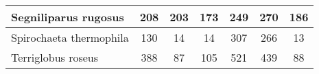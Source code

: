 \begin{minipage}{0.91\textwidth}
\begin{adjustbox}{center}
\begin{tabular}{|l||c|c|c|c|c|c|}
\hline
Segniliparus rugosus & \cellcolor[RGB]{254, 250, 250} 208 & \cellcolor[RGB]{250, 250, 254} 203 & \cellcolor[RGB]{200, 200, 249} 173 & \cellcolor[RGB]{235, 71, 71} 249 & \cellcolor[RGB]{235, 71, 71} 270 & \cellcolor[RGB]{223, 223, 251} 186 \\
\hline
Spirochaeta thermophila & \cellcolor[RGB]{252, 232, 232} 130 & \cellcolor[RGB]{232, 232, 252} 14 & \cellcolor[RGB]{232, 232, 252} 14 & \cellcolor[RGB]{235, 71, 71} 307 & \cellcolor[RGB]{246, 177, 177} 266 & \cellcolor[RGB]{232, 232, 252} 13 \\
\hline
Terriglobus roseus & \cellcolor[RGB]{252, 232, 232} 388 & \cellcolor[RGB]{232, 232, 252} 87 & \cellcolor[RGB]{232, 232, 252} 105 & \cellcolor[RGB]{250, 214, 214} 521 & \cellcolor[RGB]{251, 223, 223} 439 & \cellcolor[RGB]{232, 232, 252} 88 \\
\hline
\end{tabular}
\end{adjustbox}
\end{minipage}

